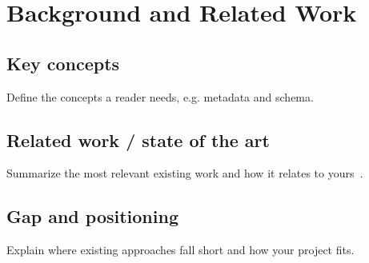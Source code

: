 \chapter{Background and Related Work}
\label{ch:background}

\section{Key concepts}
Define the concepts a reader needs, e.g. \gls{metadata} and \gls{schema}.

\section{Related work / state of the art}
Summarize the most relevant existing work and how it relates to
yours~\citep{knuth1984,sample2023}.

\section{Gap and positioning}
Explain where existing approaches fall short and how your project fits.
